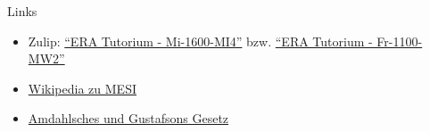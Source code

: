 \documentclass[
  german,            %
  aspectratio=169,    %
]{tumbeamer}
\begin{document}
\begin{frame}[fragile, c]{Links}{}
  \begin{itemize}
    \item Zulip: \href{https://zulip.in.tum.de/#narrow/stream/1917-ERA-Tutorium---Mi-1600-MI4}{\enquote{ERA Tutorium - Mi-1600-MI4}}
    bzw. \href{https://zulip.in.tum.de/#narrow/stream/1940-ERA-Tutorium---Fr-1100-MW2}{\enquote{ERA Tutorium - Fr-1100-MW2}}
    \item \href{https://de.wikipedia.org/wiki/MESI}{Wikipedia zu MESI}
    \item \href{https://www.educative.io/answers/difference-between-amdahls-and-gustafsons-laws}{Amdahlsches und Gustafsons Gesetz}
  \end{itemize}
\end{frame}

\maketitle
\end{document}
